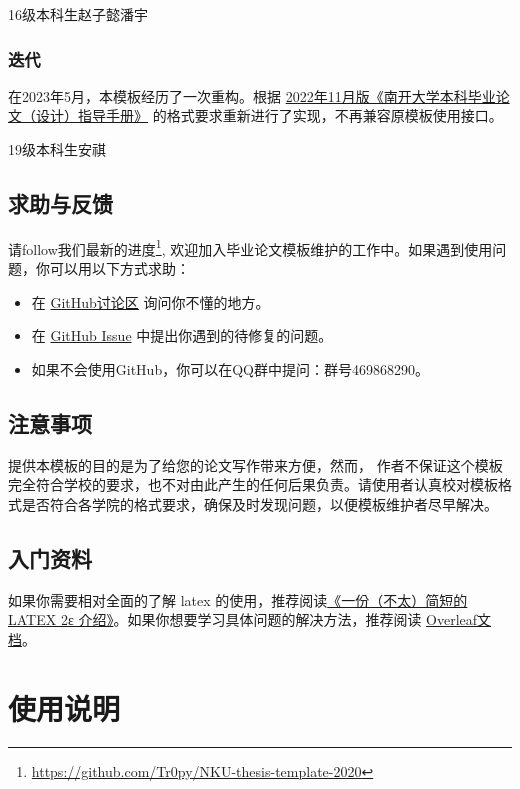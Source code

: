 \documentclass{nkuthesis}
\begin{document}
\hfill 16级本科生\quad 赵子懿\quad 潘宇

\subsubsection{迭代}

在2023年5月，本模板经历了一次重构。根据 \href{http://jwc.nankai.edu.cn/2022/1124/c24a497818/page.htm}{2022年11月版《南开大学本科毕业论文（设计）指导手册》} 的格式要求重新进行了实现，不再兼容原模板使用接口。

\hfill 19级本科生\quad 安祺

\subsection{求助与反馈}

请follow我们最新的进度\footnote{\url{https://github.com/Tr0py/NKU-thesis-template-2020}}, 
欢迎加入毕业论文模板维护的工作中。如果遇到使用问题，你可以用以下方式求助：
\begin{itemize}
  \item 在 \href{https://github.com/Tr0py/NKU-thesis-template-2020/discussions}{GitHub讨论区} 询问你不懂的地方。
  \item 在 \href{https://github.com/Tr0py/NKU-thesis-template-2020/issues}{GitHub Issue} 中提出你遇到的待修复的问题。
  \item 如果不会使用GitHub，你可以在QQ群中提问：群号469868290。
\end{itemize}

\subsection{注意事项}

提供本模板的目的是为了给您的论文写作带来方便，然而，
作者不保证这个模板完全符合学校的要求，也不对由此产生的任何后果负责。请使用者认真校对模板格式是否符合各学院的格式要求，确保及时发现问题，以便模板维护者尽早解决。

\subsection{入门资料}

如果你需要相对全面的了解 latex 的使用，推荐阅读\href{http://mirrors.ctan.org/info/lshort/chinese/lshort-zh-cn.pdf}{《一份（不太）简短的 LATEX 2ε 介绍》}。如果你想要学习具体问题的解决方法，推荐阅读 \href{https://www.overleaf.com/learn}{Overleaf文档}。

\section{使用说明} \label{chpt:A}
\end{document}
